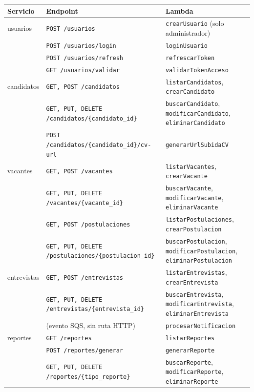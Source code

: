 \begin{longtable}{p{1.9cm}p{5.1cm}p{6.8cm}}
\toprule
\textbf{Servicio} & \textbf{Endpoint} & \textbf{Lambda} \\
\midrule
\endhead
usuarios & \texttt{POST /usuarios} & \texttt{crearUsuario} (solo administrador) \\
 & \texttt{POST /usuarios/login} & \texttt{loginUsuario} \\
 & \texttt{POST /usuarios/refresh} & \texttt{refrescarToken} \\
 & \texttt{GET /usuarios/validar} & \texttt{validarTokenAcceso} \\
\midrule
candidatos & \texttt{GET, POST /candidatos} & \texttt{listarCandidatos}, \texttt{crearCandidato} \\
 & \texttt{GET, PUT, DELETE /candidatos/\{candidato\_id\}} & \texttt{buscarCandidato}, \texttt{modificarCandidato}, \texttt{eliminarCandidato} \\
 & \texttt{POST /candidatos/\{candidato\_id\}/cv-url} & \texttt{generarUrlSubidaCV} \\
\midrule
vacantes & \texttt{GET, POST /vacantes} & \texttt{listarVacantes}, \texttt{crearVacante} \\
 & \texttt{GET, PUT, DELETE /vacantes/\{vacante\_id\}} & \texttt{buscarVacante}, \texttt{modificarVacante}, \texttt{eliminarVacante} \\
 & \texttt{GET, POST /postulaciones} & \texttt{listarPostulaciones}, \texttt{crearPostulacion} \\
 & \texttt{GET, PUT, DELETE /postulaciones/\{postulacion\_id\}} & \texttt{buscarPostulacion}, \texttt{modificarPostulacion}, \texttt{eliminarPostulacion} \\
\midrule
entrevistas & \texttt{GET, POST /entrevistas} & \texttt{listarEntrevistas}, \texttt{crearEntrevista} \\
 & \texttt{GET, PUT, DELETE /entrevistas/\{entrevista\_id\}} & \texttt{buscarEntrevista}, \texttt{modificarEntrevista}, \texttt{eliminarEntrevista} \\
 & (evento SQS, sin ruta HTTP) & \texttt{procesarNotificacion} \\
\midrule
reportes & \texttt{GET /reportes} & \texttt{listarReportes} \\
 & \texttt{POST /reportes/generar} & \texttt{generarReporte} \\
 & \texttt{GET, PUT, DELETE /reportes/\{tipo\_reporte\}} & \texttt{buscarReporte}, \texttt{modificarReporte}, \texttt{eliminarReporte} \\
\bottomrule
\end{longtable}

